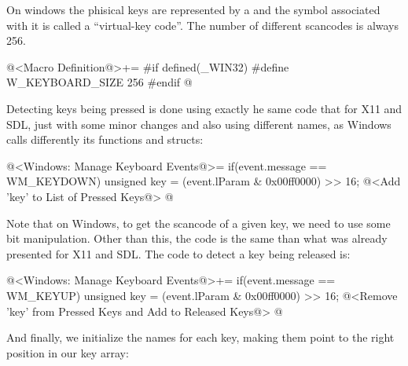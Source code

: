 
On windows the phisical keys are represented by
a  and the symbol associated with it is called a
``virtual-key code''. The number of different scancodes is always 256.

\iniciocodigo
@<Macro Definition@>+=
#if defined(_WIN32)
#define W_KEYBOARD_SIZE 256
#endif
@
\fimcodigo

Detecting keys being pressed is done using exactly he same code that
for X11 and SDL, just with some minor changes and also using different
names, as Windows calls differently its functions and structs:

\iniciocodigo
@<Windows: Manage Keyboard Events@>=
if(event.message == WM_KEYDOWN){
  unsigned key = (event.lParam & 0x00ff0000) >> 16;
  @<Add 'key' to List of Pressed Keys@>
}
@
\fimcodigo

Note that on Windows, to get the scancode of a given key, we need to
use some bit manipulation. Other than this, the code is the same than
what was already presented for X11 and SDL. The code to detect a key
being released is:

\iniciocodigo
@<Windows: Manage Keyboard Events@>+=
if(event.message == WM_KEYUP){
  unsigned key = (event.lParam & 0x00ff0000) >> 16;
  @<Remove 'key' from Pressed Keys and Add to Released Keys@>
}
@
\fimcodigo

And finally, we initialize the names for each key, making them point
to the right position in our key array:

